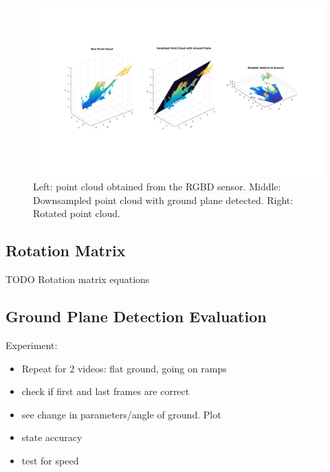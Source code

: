 \begin{figure}
\centering
\includegraphics[width=6in]{figures/pointclouds.png}
\caption{Left: point cloud obtained from the RGBD sensor. Middle:
Downsampled point cloud with ground plane detected. Right: Rotated point cloud.}
\label{fig:pointclouds}
\end{figure}

\subsection{Rotation Matrix}
TODO Rotation matrix equations

\subsection{Ground Plane Detection Evaluation}
Experiment: 
\begin{itemize}
\item Repeat for 2 videos: flat ground, going on ramps
\item check if first and last frames are correct
\item see change in parameters/angle of ground. Plot
\item state accuracy
\item test for speed
\end{itemize}

